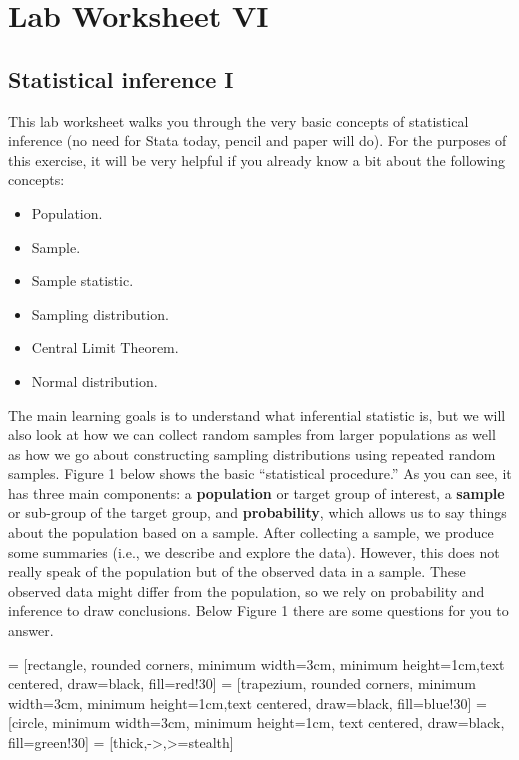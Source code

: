 \section{\hfil Lab Worksheet VI \hfil}
\subsection*{Statistical inference I}

This lab worksheet walks you through the very basic concepts of statistical inference (no need for Stata today, pencil and paper will do). For the purposes of this exercise, it will be very helpful if you already know a bit about the following concepts:

\begin{itemize}
    \item Population.
    \item Sample.
    \item Sample statistic.
    \item Sampling distribution.
    \item Central Limit Theorem.
    \item Normal distribution.
\end{itemize}

The main learning goals is to understand what inferential statistic is, but we will also look at how we can collect random samples from larger populations as well as how we go about constructing sampling distributions using repeated random samples. Figure 1 below shows the basic ``statistical procedure.'' As you can see, it has three main components: a \textbf{population} or target group of interest, a \textbf{sample} or sub-group of the target group, and \textbf{probability}, which allows us to say things about the population based on a sample. After collecting a sample, we produce some summaries (i.e., we describe and explore the data). However, this does not really speak of the population but of the observed data in a sample. These observed data might differ from the population, so we rely on probability and inference to draw conclusions. Below Figure 1 there are some questions for you to answer. 

 = [rectangle, rounded corners, minimum width=3cm, minimum height=1cm,text centered, draw=black, fill=red!30]
 = [trapezium, rounded corners, minimum width=3cm, minimum height=1cm,text centered, draw=black, fill=blue!30]
 = [circle, minimum width=3cm, minimum height=1cm, text centered, draw=black, fill=green!30]
 = [thick,->,>=stealth]

